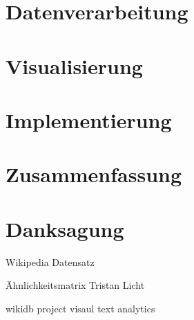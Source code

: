 \chapter{Datenverarbeitung}
\label{chap:daten_ver}


\chapter{Visualisierung}
\label{chap:visualization}


\chapter{Implementierung}
\label{chap:Implementierung}


\chapter{Zusammenfassung}
\label{chap:Zusammenfassung}


\cleardoublepage
\clearpage



\newpage
\let\cleardoublepage\clearpage
\chapter*{Danksagung}

Wikipedia Datensatz

Ähnlichkeitsmatrix Tristan Licht

wikidb project visaul text analytics







